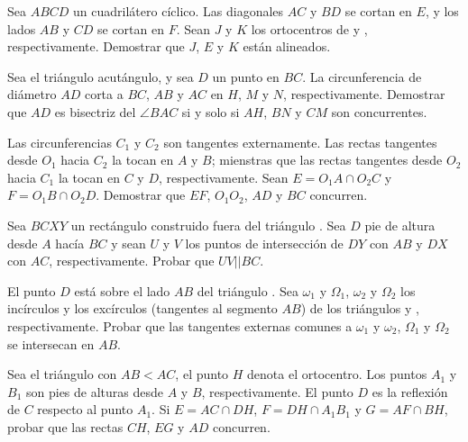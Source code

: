 \begin{section-problem}
    Sea $ABCD$ un cuadrilátero cíclico.
    Las diagonales $AC$ y $BD$ se cortan en $E$, y los lados $AB$ y $CD$ se cortan en $F$.
    Sean $J$ y $K$ los ortocentros de  y , respectivamente.
    Demostrar que $J$, $E$ y $K$ están alineados.
\end{section-problem}

\begin{section-problem}
    Sea el triángulo acutángulo, y sea $D$ un punto en $BC$.
    La circunferencia de diámetro $AD$ corta a $BC$, $AB$ y $AC$ en $H$, $M$ y $N$, respectivamente.
    Demostrar que $AD$ es bisectriz del $\angle BAC$ si y solo si $AH$, $BN$ y $CM$ son concurrentes.
\end{section-problem}

\begin{section-problem}
    Las circunferencias $C_1$ y $C_2$ son tangentes externamente.
    Las rectas tangentes desde $O_1$ hacia $C_2$ la tocan en $A$ y $B$; mienstras que las rectas tangentes desde $O_2$ hacia $C_1$ la tocan en $C$ y $D$, respectivamente.
    Sean $E = O_1 A \cap O_2 C$ y $F = O_1 B \cap O_2 D$.
    Demostrar que $EF$, $O_1 O_2$, $AD$ y $BC$ concurren.
\end{section-problem}

\begin{section-problem}
    Sea $BCXY$ un rectángulo construido fuera del triángulo .
    Sea $D$ pie de altura desde $A$ hacía $BC$ y sean $U$ y $V$ los puntos de intersección de $DY$ con $AB$ y $DX$ con $AC$, respectivamente.
    Probar que $UV || BC$.
\end{section-problem}

\begin{section-problem}
    El punto $D$ está sobre el lado $AB$ del triángulo .
    Sea $\omega_1$ y $\Omega_1$, $\omega_2$ y $\Omega_2$ los incírculos y los excírculos (tangentes al segmento $AB$) de los triángulos  y , respectivamente.
    Probar que las tangentes externas comunes a $\omega_1$ y $\omega_2$, $\Omega_1$ y $\Omega_2$ se intersecan en $AB$.
\end{section-problem}

\begin{section-problem}
    Sea el triángulo  con $AB < AC$, el punto $H$ denota el ortocentro.
    Los puntos $A_1$ y $B_1$ son pies de alturas desde $A$ y $B$, respectivamente.
    El punto $D$ es la reflexión de $C$ respecto al punto $A_1$.
    Si $E = AC \cap DH$, $F = DH \cap A_1 B_1$ y $G = AF \cap BH$, probar que las rectas $CH$, $EG$ y $AD$ concurren.
\end{section-problem}

